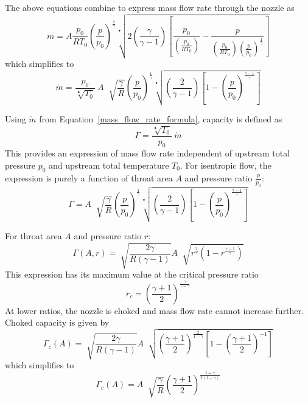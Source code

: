 \documentclass[a4paper, 11pt, oneside]{report}
\begin{document}
The above equations combine to express mass flow rate through the nozzle as
\begin{equation}
\dot{m} =
A
\frac{p_0}{R T_0}
\left(\frac{p}{p_0}\right)^\frac{1}{\gamma}
\sqrt[•]{ 
2 \left( \frac{\gamma}{\gamma - 1} \right) 
\left[ \frac{p_0}{ \left( \frac{p_0}{R T_0} \right) } - \frac{p}{ \left( \frac{p_0}{R T_0} \right) \left(\frac{p}{p_0}\right)^\frac{1}{\gamma} } \right] 
}
\end{equation}
which simplifies to
\begin{equation}\label{mass_flow_rate_formula}
\dot{m} =
\frac{p_0}{\sqrt[•]{T_0}} \>
A \;
\sqrt[]{\frac{\gamma}{R}}
\left(
    \frac{p}{p_0}
\right)^\frac{1}{\gamma}
\sqrt[•]{
	\left(
		\frac{2}{\gamma - 1}  
	\right)
	\left[
		1 - \left( \frac{p}{p_0} \right)^\frac{\gamma-1}{\gamma}
	\right] 
}
\end{equation}

Using $\dot{m}$ from Equation~\ref{mass_flow_rate_formula}, capacity is defined as
\begin{equation}\label{capacity_definition}
\Gamma = \frac{\sqrt[•]{T_0}}{p_0}  \>
\dot{m}
\end{equation}
This provides an expression of mass flow rate independent of upstream total pressure $p_0$ and upstream total temperature $T_0$. For isentropic flow, the expression is purely a function of throat area $A$ and pressure ratio $\frac{p}{p_0}$:
\begin{equation}
\Gamma =
A \;
\sqrt[]{\frac{\gamma}{R}}
\left(
    \frac{p}{p_0}
\right)^\frac{1}{\gamma}
\sqrt[•]{
	\left(
		\frac{2}{\gamma - 1}  
	\right)
	\left[
		1 - \left( \frac{p}{p_0} \right)^\frac{\gamma-1}{\gamma}
	\right] 
}
\end{equation}

For throat area $A$ and pressure ratio $r$:
\begin{equation}
\Gamma \left( A, r \right) = 
\sqrt[]{\frac{2\gamma}{R\left(\gamma-1\right)}}
A \;
\sqrt[]{
	r^\frac{2}{\gamma}
	\left(
		1 - r ^\frac{\gamma-1}{\gamma}
	\right) 
}
\end{equation}
This expression has its maximum value at the critical pressure ratio
\begin{equation}
r_c =
\left(
	\frac{\gamma+1}{2}
\right)
^\frac{\gamma}{1-\gamma}
\end{equation}
At lower ratios, the nozzle is choked and mass flow rate cannot increase further. Choked capacity is given by
\begin{equation}
\Gamma_c \left( A \right) =
\sqrt[]{\frac{2\gamma}{R\left(\gamma-1\right)}}
A \;
\sqrt[]{
	\left(
		\frac{\gamma+1}{2}  
	\right)
	^\frac{2}{1-\gamma}
	\left[
		1 - 
		\left(
			\frac{\gamma+1}{2}
		\right)
		^{-1}
	\right]
}
\end{equation}
which simplifies to
\begin{equation}\label{choked_capacity_from_area}
\Gamma_c \left( A \right) =
A \;
\sqrt[]{
	\frac{\gamma}{R}
}
\left(
	\frac{\gamma+1}{2}
\right)
^\frac{1+\gamma}{2\left(1-\gamma\right)}
\end{equation}
\end{document}
